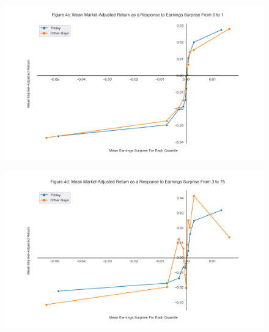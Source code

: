 \documentclass[11pt]{article}
\begin{document}
\begin{figure}[H] 
    \centering
    \includegraphics[width=.8\textwidth]{fig4c.png}
\end{figure}

\begin{figure}[H] 
    \centering
    \includegraphics[width=.8\textwidth]{fig4d.png}
\end{figure}
\end{document}
